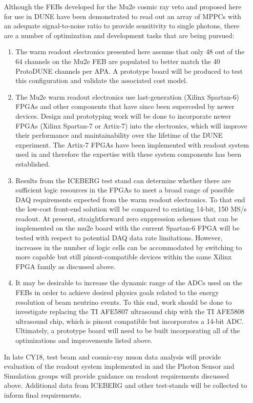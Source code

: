 Although the FEBs developed for the Mu2e cosmic ray veto and proposed here for use in DUNE have been demonstrated to read out an array of MPPCs with an adequate signal-to-noise ratio to provide sensitivity to single photons, there are a number of optimization and development tasks that are being pursued:  
\begin{enumerate}
\item The warm readout electronics presented here assume that only 48 out of the 64 channels on the Mu2e FEB are populated to better match the 40 ProtoDUNE channels per APA.  A prototype board will be produced to test this configuration and validate the associated cost model.  
\item The Mu2e warm readout electronics use last-generation (Xilinx Spartan-6) FPGAs and other components that have since been superceded by newer devices.  Design and prototyping work will be done to incorporate newer FPGAs (Xilinx Spartan-7 or Artix-7) into the electronics, which will improve their performance and maintainability over the lifetime of the DUNE experiment. The Artix-7 FPGAs have been implemented with  readout system used in  and therefore the expertise with these system components has been established. 
\item Results from the ICEBERG test stand can determine whether there are sufficient logic resources in the FPGAs to meet a broad range of possible DAQ requirements expected from the warm readout electronics. To that end the low-cost front-end solution will be compared to existing 14-bit, 150 MS/s  readout. At present, straightforward zero suppression schemes that can be implemented on the mu2e board with the current Spartan-6 FPGA will be tested with respect to potential DAQ data rate limitations.  However, increases in the number of logic cells can be accommodated by switching to more capable but still pinout-compatible devices within the same Xilinx FPGA family as discussed above.  
\item It may be desirable to increase the dynamic range of the ADCs used on the FEBs in order to achieve desired physics goals related to the energy resolution of beam neutrino events.  To this end, work should be done to investigate replacing the TI AFE5807 ultrasound chip with the TI AFE5808 ultrasound chip, which is pinout compatible but incorporates a 14-bit ADC.  Ultimately, a prototype board will need to be built incorporating all of the optimizations and improvements listed above.
\end{enumerate}
In late CY18,  test beam and cosmic-ray muon data analysis will provide evaluation of the readout system implemented in  and the  Photon Sensor and Simulation groups will provide guidance on readout requirements discussed above. Additional data from ICEBERG and other test-stands will be collected to inform final requirements.

